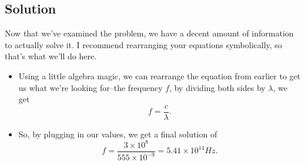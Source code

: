 \documentclass[12pt]{article}
\begin{document}
\subsection*{Solution}
Now that we've examined the problem, we have a decent amount of information to actually solve it. I recommend rearranging your equations symbolically, so that's what we'll do here.
\begin{itemize}
    \item Using a little algebra magic, we can rearrange the equation from earlier to get us what we're looking for--the frequency \(f\), by dividing both sides by \(\lambda\), we get \[f = \frac{c}{\lambda}.\]
    \item So, by plugging in our values, we get a final solution of \[f = \frac{3\times10^{8}}{555\times10^{-9}} = 5.41\times10^{14}Hz.\]
\end{itemize}
\end{document}
